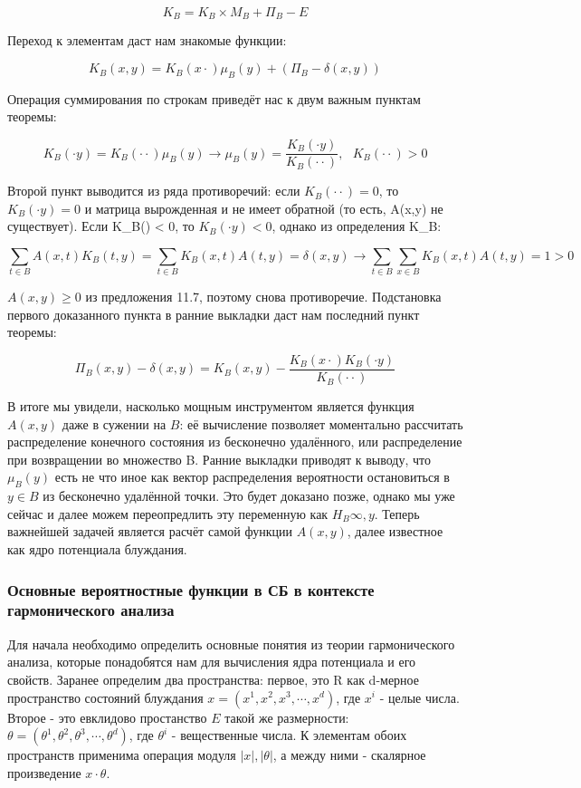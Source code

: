 \[ K_B = K_B \times M_B + \Pi_B - E \]

Переход к элементам даст нам знакомые функции:

\[ K_B(x, y) = K_B(x \cdot) \mu_B(y) + (\Pi_B - \delta(x,y))\] 

Операция суммирования по строкам приведёт нас к двум важным пунктам теоремы:

\[ K_B(\cdot y) = K_B(\cdot \cdot) \mu_B(y) \rightarrow \mu_B(y) = \frac{K_B(\cdot y)}{K_B(\cdot \cdot)},\ \ \ K_B(\cdot \cdot) > 0 \]

Второй пункт выводится из ряда противоречий: если $K_B(\cdot \cdot) = 0$, то $K_B(\cdot y) = 0$ и матрица вырожденная и не имеет обратной (то есть, A(x,y) 
не существует). Если K_B(\cdot \cdot) < 0, то $K_B(\cdot y) < 0$, однако из определения K_B: 

\[ \sum_{t \in B} A(x,t) K_B(t,y) = \sum_{t \in B} K_B(x,t) A(t,y) = \delta(x,y) \rightarrow \sum_{t \in B} \sum_{x \in B} K_B(x,t) A(t,y) = 1 > 0 \]

$A(x,y) \geq 0$ из предложения 11.7, поэтому снова противоречие.
Подстановка первого доказанного пункта в ранние выкладки даст нам последний пункт теоремы:

\begin{equation}
\Pi_B(x,y) - \delta(x,y) = K_B(x,y) - \frac{K_B(x \cdot) K_B(\cdot y)}{K_B(\cdot \cdot)}
\label{eq:P_b}
\end{equation}

В итоге мы увидели, насколько мощным инструментом является функция $A(x,y)$ даже в сужении на $B$: её вычисление позволяет моментально рассчитать распределение 
конечного состояния из бесконечно удалённого, или распределение при возвращении во множество B. 
Ранние выкладки приводят к выводу, что $\mu_B(y)$ есть не что иное как вектор распределения вероятности остановиться в $y \in B$ из бесконечно удалённой точки.
Это будет доказано позже, однако мы уже сейчас и далее можем переопредлить эту переменную как $H_B{\infty, y}$. 
Теперь важнейшей задачей является расчёт самой функции $A(x,y)$, далее известное как ядро потенциала блуждания. 

\subsubsection{Основные вероятностные функции в СБ в контексте гармонического анализа}

Для начала необходимо определить основные понятия из теории гармонического анализа, которые понадобятся нам для вычисления ядра потенциала и его свойств.
Заранее определим два пространства: первое, это R как d-мерное пространство состояний блуждания $x = (x^1, x^2, x^3, \cdots, x^d)$, где $x^i$ - целые числа. 
Второе - это евклидово простанство $E$ такой же размерности: $\theta = (\theta^1, \theta^2, \theta^3, \cdots, \theta^d)$, где $\theta^i$ - вещественные числа.
К элементам обоих пространств применима операция модуля $|x|, |\theta|$, а между ними - скалярное произведение $x \cdot \theta$.

